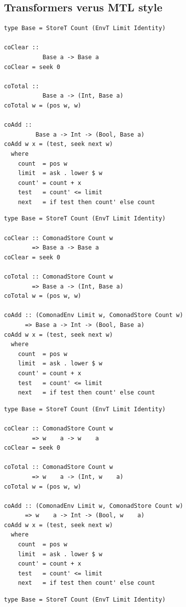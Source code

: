 \documentclass{beamer}
\begin{document}
\subsection{Transformers verus MTL style}

\begin{frame}[fragile]
  \begin{overprint}
  \begin{verbatim}
type Base = StoreT Count (EnvT Limit Identity)

coClear ::
           Base a -> Base a
coClear = seek 0

coTotal ::
           Base a -> (Int, Base a)
coTotal w = (pos w, w)

coAdd ::
         Base a -> Int -> (Bool, Base a)
coAdd w x = (test, seek next w)
  where
    count  = pos w
    limit  = ask . lower $ w
    count' = count + x
    test   = count' <= limit
    next   = if test then count' else count
  \end{verbatim}
  \begin{verbatim}
type Base = StoreT Count (EnvT Limit Identity)

coClear :: ComonadStore Count w
        => Base a -> Base a
coClear = seek 0

coTotal :: ComonadStore Count w
        => Base a -> (Int, Base a)
coTotal w = (pos w, w)

coAdd :: (ComonadEnv Limit w, ComonadStore Count w)
      => Base a -> Int -> (Bool, Base a)
coAdd w x = (test, seek next w)
  where
    count  = pos w
    limit  = ask . lower $ w
    count' = count + x
    test   = count' <= limit
    next   = if test then count' else count
  \end{verbatim}
  \begin{verbatim}
type Base = StoreT Count (EnvT Limit Identity)

coClear :: ComonadStore Count w
        => w    a -> w    a
coClear = seek 0

coTotal :: ComonadStore Count w
        => w    a -> (Int, w    a)
coTotal w = (pos w, w)

coAdd :: (ComonadEnv Limit w, ComonadStore Count w)
      => w    a -> Int -> (Bool, w    a)
coAdd w x = (test, seek next w)
  where
    count  = pos w
    limit  = ask . lower $ w
    count' = count + x
    test   = count' <= limit
    next   = if test then count' else count
  \end{verbatim}
    \begin{verbatim}
type Base = StoreT Count (EnvT Limit Identity)


\end{verbatim}
\end{overprint}
\end{frame}
\end{document}
